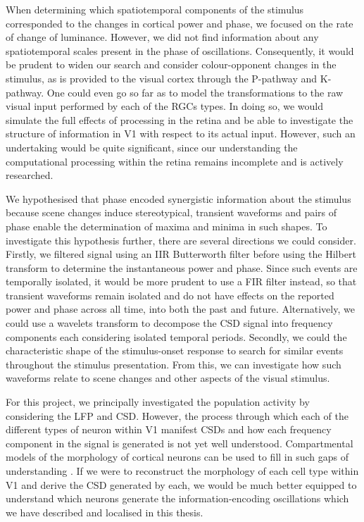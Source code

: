 When determining which spatiotemporal components of the stimulus corresponded to the changes in cortical power and phase, we focused on the rate of change of luminance.
However, we did not find information about any spatiotemporal scales present in the phase of oscillations.
Consequently, it would be prudent to widen our search and consider colour-opponent changes in the stimulus, as is provided to the visual cortex through the P-pathway and K-pathway.
One could even go so far as to model the transformations to the raw visual input performed by each of the \acp{RGC} types.
In doing so, we would simulate the full effects of processing in the retina and be able to investigate the structure of information in \ac{V1} with respect to its actual input.
However, such an undertaking would be quite significant, since our understanding the computational processing within the retina remains incomplete and is actively researched.

We hypothesised that phase encoded synergistic information about the stimulus because scene changes induce stereotypical, transient waveforms and pairs of phase enable the determination of maxima and minima in such shapes.
To investigate this hypothesis further, there are several directions we could consider.
Firstly, we filtered signal using an \ac{IIR} Butterworth filter before using the Hilbert transform to determine the instantaneous power and phase.
Since such events are temporally isolated, it would be more prudent to use a \ac{FIR} filter instead, so that transient waveforms remain isolated and do not have effects on the reported power and phase across all time, into both the past and future.
Alternatively, we could use a wavelets transform to decompose the \ac{CSD} signal into frequency components each considering isolated temporal periods.
Secondly, we could the characteristic shape of the stimulus-onset response to search for similar events throughout the stimulus presentation.
From this, we can investigate how such waveforms relate to scene changes and other aspects of the visual stimulus.


For this project, we principally investigated the population activity by considering the \ac{LFP} and \ac{CSD}.
However, the process through which each of the different types of neuron within \ac{V1} manifest \acp{CSD} and how each frequency component in the signal is generated is not yet well understood.
Compartmental models of the morphology of cortical neurons can be used to fill in such gaps of understanding \citep{Leski2013}.
If we were to reconstruct the morphology of each cell type within \ac{V1} and derive the \ac{CSD} generated by each, we would be much better equipped to understand which neurons generate the information-encoding oscillations which we have described and localised in this thesis.
